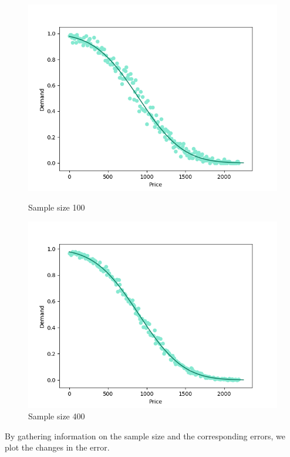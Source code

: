 \documentclass[11pt, a4paper]{article}
\theoremstyle{definition}
\begin{document}
			\begin{figure}[H]
				\begin{minipage}{0.48\textwidth}
					\centering
					\includegraphics[width=\linewidth]{Exp_and_math_100}
					\caption{Sample size 100}\label{Fig:Data3}
				\end{minipage}\hfill
				\begin{minipage}{0.48\textwidth}
					\centering
					\includegraphics[width=\linewidth]{Exp_and_math_400}
					\caption{Sample size 400}\label{Fig:Data4}
				\end{minipage}
			\end{figure}\par\noindent
			By gathering information on the sample size and the corresponding errors, we plot the changes in the error.
\end{document}
